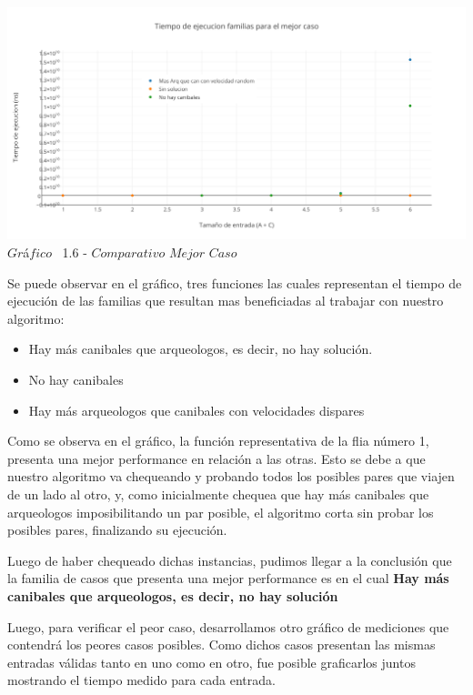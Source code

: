    \vspace*{0.3cm} \vspace*{0.3cm}
  \begin{center}
 \includegraphics[scale=0.65]{./EJ1/comparativomejorcaso.png}
 {$Gr$\'a$fico$ \ 1.6 - $Comparativo$ $Mejor$ $Caso$}
  \end{center}
  \vspace*{0.3cm}

Se puede observar en el gr\'afico, tres funciones las cuales representan el tiempo de ejecuci\'on de las familias que resultan mas beneficiadas al trabajar con nuestro algoritmo:\\
\begin{itemize}
\item Hay m\'as canibales que arqueologos, es decir, no hay soluci\'on.
\item No hay canibales
\item Hay m\'as arqueologos que canibales con velocidades dispares
\end{itemize}

Como se observa en el gr\'afico, la funci\'on representativa de la flia n\'umero 1, presenta una mejor performance en relaci\'on a las otras. Esto se debe a que nuestro algoritmo va chequeando y probando todos los posibles pares que viajen de un lado al otro, y, como inicialmente chequea que hay m\'as canibales que arqueologos imposibilitando un par posible, el algoritmo corta sin probar los posibles pares, finalizando su ejecuci\'on.

Luego de haber chequeado dichas instancias, pudimos llegar a la conclusi\'on que la familia de casos que presenta una mejor performance 
es en el cual \textbf{Hay m\'as canibales que arqueologos, es decir, no hay soluci\'on}

Luego, para verificar el peor caso, desarrollamos otro gr\'afico de mediciones que contendr\'a los peores casos posibles. Como dichos casos presentan las mismas entradas v\'alidas tanto en uno como en otro, fue posible graficarlos juntos mostrando el tiempo medido para cada entrada.\\

